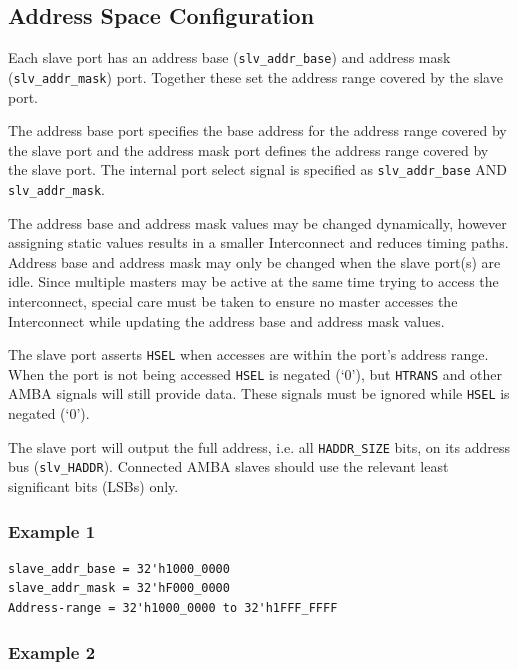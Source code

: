 \subsection{Address Space
Configuration}\label{address-space-configuration}

Each slave port has an address base (\texttt{slv\_addr\_base}) and address mask
(\texttt{slv\_addr\_mask}) port. Together these set the address range covered by
the slave port.

The address base port specifies the base address for the address range
covered by the slave port and the address mask port defines the address
range covered by the slave port. The internal port select signal is
specified as \texttt{slv\_addr\_base} AND \texttt{slv\_addr\_mask}.

The address base and address mask values may be changed dynamically,
however assigning static values results in a smaller Interconnect and
reduces timing paths. Address base and address mask may only be changed
when the slave port(s) are idle. Since multiple masters may be active at
the same time trying to access the interconnect, special care must be
taken to ensure no master accesses the Interconnect while updating the
address base and address mask values.

The slave port asserts \texttt{HSEL} when accesses are within the port's address
range. When the port is not being accessed \texttt{HSEL} is negated (`0'), but
\texttt{HTRANS} and other AMBA signals will still provide data. These signals
must be ignored while \texttt{HSEL} is negated (`0').

The slave port will output the full address, i.e. all \texttt{HADDR\_SIZE} bits,
on its address bus (\texttt{slv\_HADDR}). Connected AMBA slaves should use the
relevant least significant bits (LSBs) only.

\pagebreak

\subsubsection{Example 1}\label{example-1}

\begin{verbatim}
slave_addr_base = 32'h1000_0000
slave_addr_mask = 32'hF000_0000
Address-range = 32'h1000_0000 to 32'h1FFF_FFFF
\end{verbatim}

\subsubsection{Example 2}\label{example-2}

